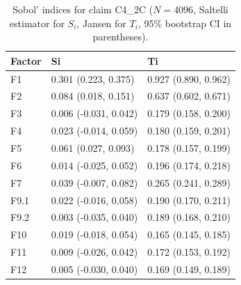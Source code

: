 \begin{table}[ht]
\centering
\caption{Sobol' indices for claim C4_2C ($N=4096$, Saltelli estimator for $S_i$, Jansen for $T_i$, 95\% bootstrap CI in parentheses).} 
\label{tab:sobol_C4_2C}
\begin{tabular}{lll}
  \hline
Factor & Si & Ti \\ 
  \hline
F1 & 0.301 (0.223, 0.375) & 0.927 (0.890, 0.962) \\ 
  F2 & 0.084 (0.018, 0.151) & 0.637 (0.602, 0.671) \\ 
  F3 & 0.006 (-0.031, 0.042) & 0.179 (0.158, 0.200) \\ 
  F4 & 0.023 (-0.014, 0.059) & 0.180 (0.159, 0.201) \\ 
  F5 & 0.061 (0.027, 0.093) & 0.178 (0.157, 0.199) \\ 
  F6 & 0.014 (-0.025, 0.052) & 0.196 (0.174, 0.218) \\ 
  F7 & 0.039 (-0.007, 0.082) & 0.265 (0.241, 0.289) \\ 
  F9.1 & 0.022 (-0.016, 0.058) & 0.190 (0.170, 0.211) \\ 
  F9.2 & 0.003 (-0.035, 0.040) & 0.189 (0.168, 0.210) \\ 
  F10 & 0.019 (-0.018, 0.054) & 0.165 (0.145, 0.185) \\ 
  F11 & 0.009 (-0.026, 0.042) & 0.172 (0.153, 0.192) \\ 
  F12 & 0.005 (-0.030, 0.040) & 0.169 (0.149, 0.189) \\ 
   \hline
\end{tabular}
\end{table}

